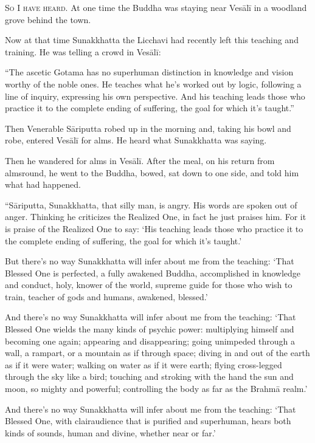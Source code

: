 \documentclass[12pt,openany]{book}%
\newcommand*{\scevam}[1]{\textsc{#1}}
\begin{document}
\scevam{So I have heard. }At one time the Buddha was staying near \textsanskrit{Vesālī} in a woodland grove behind the town. 

Now at that time Sunakkhatta the Licchavi had recently left this teaching and training. He was telling a crowd in \textsanskrit{Vesālī}: 

“The ascetic Gotama has no superhuman distinction in knowledge and vision worthy of the noble ones. He teaches what he’s worked out by logic, following a line of inquiry, expressing his own perspective. And his teaching leads those who practice it to the complete ending of suffering, the goal for which it’s taught.” 

Then Venerable \textsanskrit{Sāriputta} robed up in the morning and, taking his bowl and robe, entered \textsanskrit{Vesālī} for alms. He heard what Sunakkhatta was saying. 

Then he wandered for alms in \textsanskrit{Vesālī}. After the meal, on his return from almsround, he went to the Buddha, bowed, sat down to one side, and told him what had happened. 

“\textsanskrit{Sāriputta}, Sunakkhatta, that silly man, is angry. His words are spoken out of anger. Thinking he criticizes the Realized One, in fact he just praises him. For it is praise of the Realized One to say: ‘His teaching leads those who practice it to the complete ending of suffering, the goal for which it’s taught.’ 

But there’s no way Sunakkhatta will infer about me from the teaching: ‘That Blessed One is perfected, a fully awakened Buddha, accomplished in knowledge and conduct, holy, knower of the world, supreme guide for those who wish to train, teacher of gods and humans, awakened, blessed.’ 

And there’s no way Sunakkhatta will infer about me from the teaching: ‘That Blessed One wields the many kinds of psychic power: multiplying himself and becoming one again; appearing and disappearing; going unimpeded through a wall, a rampart, or a mountain as if through space; diving in and out of the earth as if it were water; walking on water as if it were earth; flying cross-legged through the sky like a bird; touching and stroking with the hand the sun and moon, so mighty and powerful; controlling the body as far as the \textsanskrit{Brahmā} realm.’ 

And there’s no way Sunakkhatta will infer about me from the teaching: ‘That Blessed One, with clairaudience that is purified and superhuman, hears both kinds of sounds, human and divine, whether near or far.’ 
\end{document}
